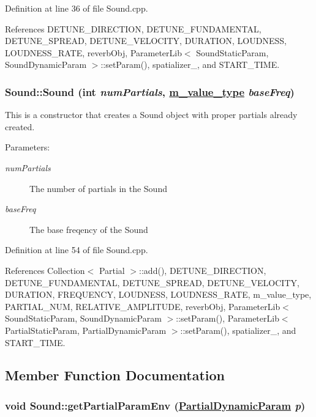 Definition at line 36 of file Sound.cpp.

References DETUNE\_\-DIRECTION, DETUNE\_\-FUNDAMENTAL, DETUNE\_\-SPREAD, DETUNE\_\-VELOCITY, DURATION, LOUDNESS, LOUDNESS\_\-RATE, reverb\-Obj, Parameter\-Lib$<$ Sound\-Static\-Param, Sound\-Dynamic\-Param $>$::set\-Param(), spatializer\_\-, and START\_\-TIME.\hypertarget{classSound_a1}{
\subsubsection[Sound]{\setlength{\rightskip}{0pt plus 5cm}Sound::Sound (int {\em num\-Partials}, \hyperlink{Types_8h_a3}{m\_\-value\_\-type} {\em base\-Freq})}}
\label{classSound_a1}


This is a constructor that creates a Sound object with proper partials already created. \begin{Desc}
\item[Parameters:]
\begin{description}
\item[{\em num\-Partials}]The number of partials in the Sound \item[{\em base\-Freq}]The base freqency of the Sound \end{description}
\end{Desc}


Definition at line 54 of file Sound.cpp.

References Collection$<$ Partial $>$::add(), DETUNE\_\-DIRECTION, DETUNE\_\-FUNDAMENTAL, DETUNE\_\-SPREAD, DETUNE\_\-VELOCITY, DURATION, FREQUENCY, LOUDNESS, LOUDNESS\_\-RATE, m\_\-value\_\-type, PARTIAL\_\-NUM, RELATIVE\_\-AMPLITUDE, reverb\-Obj, Parameter\-Lib$<$ Sound\-Static\-Param, Sound\-Dynamic\-Param $>$::set\-Param(), Parameter\-Lib$<$ Partial\-Static\-Param, Partial\-Dynamic\-Param $>$::set\-Param(), spatializer\_\-, and START\_\-TIME.

\subsection{Member Function Documentation}
\hypertarget{classSound_a5}{
\subsubsection[getPartialParamEnv]{\setlength{\rightskip}{0pt plus 5cm}void Sound::get\-Partial\-Param\-Env (\hyperlink{Partial_8h_a20}{Partial\-Dynamic\-Param} {\em p})}}
\label{classSound_a5}


